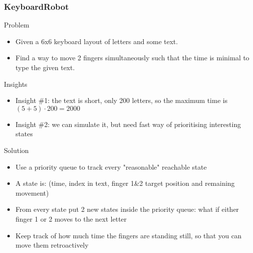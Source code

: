 \documentclass{beamer}
\begin{document}
\begin{frame}
    \frametitle{KeyboardRobot}
    \begin{block}{Problem}
        \begin{itemize}
            \item Given a 6x6 keyboard layout of letters and some text.
            \item Find a way to move 2 fingers simultaneously such that the time is minimal to type the given text.
        \end{itemize}
    \end{block}
    \begin{block}{Insights}
        \begin{itemize}
            \item Insight \#1: the text is short, only 200 letters, so the maximum time is $(5+5)\cdot200 = 2000$
            \item Insight \#2: we can simulate it, but need fast way of prioritising interesting states
        \end{itemize}
    \end{block}
    \begin{block}{Solution}
        \begin{itemize}
            \item Use a priority queue to track every "reasonable" reachable state
            \item A state is: (time, index in text, finger 1\&2 target position and remaining movement)
            \item From every state put 2 new states inside the priority queue: what if either finger 1 or 2 moves to the next letter
            \item Keep track of how much time the fingers are standing still, so that you can move them retroactively
        \end{itemize}
    \end{block}
\end{frame}
\end{document}
